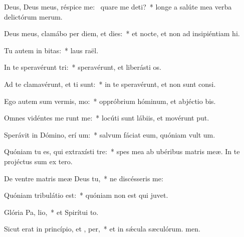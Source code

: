 \item Deus, Deus meus, réspice  me:~\pscross{} quare me deti?~* longe a salúte mea verba delictórum merum.
\item Deus meus, clamábo per diem, et  dies:~* et nocte, et non ad insipiéntiam hi.
\item Tu autem in  bitas:~* laus raël.
\item In te speravérunt  tri:~* speravérunt, et liberásti os.
\item Ad te clamavérunt, et  ti sunt:~* in te speravérunt, et non sunt consi.
\item Ego autem sum vermis,   mo:~* oppróbrium hóminum, et abjéctio bis.
\item Omnes vidéntes me runt me:~* locúti sunt lábiis, et movérunt put.
\item Sperávit in Dómino, erí um:~* salvum fáciat eum, quóniam vult um.
\item Quóniam tu es, qui extraxísti   tre:~* spes mea ab ubéribus matris meæ. In te projéctus sum ex tero.
\item De ventre matris meæ Deus   tu,~* ne discésseris  me:
\item Quóniam tribulátio  est:~* quóniam non est qui juvet.
\item Glória Pa,  lio,~* et Spirítui to.
\item Sicut erat in princípio, et ,  per,~* et in sǽcula sæculórum. men.
